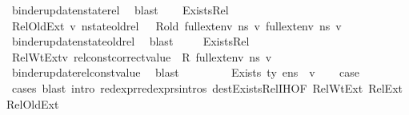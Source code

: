 \begin{isabellebody}
\ binder{\isacharunderscore}{\kern0pt}update{\isacharunderscore}{\kern0pt}nstate{\isacharunderscore}{\kern0pt}rel\ \isamarkupfalse%
\ blast\isanewline
\ \ \isamarkupfalse%
\ Exists{\isacharunderscore}{\kern0pt}Rel\ \isamarkupfalse%
\ RelOldExt{\isacharcolon}{\kern0pt}\ {\isachardoublequoteopen}{\isasymAnd}v{\isachardot}{\kern0pt}\ nstate{\isacharunderscore}{\kern0pt}old{\isacharunderscore}{\kern0pt}rel\ {\isasymLambda}\ {\isasymLambda}{\isacharprime}{\kern0pt}\ R{\isacharunderscore}{\kern0pt}old\ {\isacharparenleft}{\kern0pt}full{\isacharunderscore}{\kern0pt}ext{\isacharunderscore}{\kern0pt}env\ ns{}\ v{\isacharparenright}{\kern0pt}\ {\isacharparenleft}{\kern0pt}full{\isacharunderscore}{\kern0pt}ext{\isacharunderscore}{\kern0pt}env\ ns{}\ v{\isacharparenright}{\kern0pt}{\isachardoublequoteclose}\ \isamarkupfalse%
\ binder{\isacharunderscore}{\kern0pt}update{\isacharunderscore}{\kern0pt}nstate{\isacharunderscore}{\kern0pt}old{\isacharunderscore}{\kern0pt}rel\ \isamarkupfalse%
\ blast\ \isanewline
\ \ \isamarkupfalse%
\ Exists{\isacharunderscore}{\kern0pt}Rel\ \isamarkupfalse%
\ RelWtExt{\isacharcolon}{\kern0pt}{\isachardoublequoteopen}{\isasymAnd}v{\isachardot}{\kern0pt}\ rel{\isacharunderscore}{\kern0pt}const{\isacharunderscore}{\kern0pt}correct{\isacharunderscore}{\kern0pt}value\ {\isasymLambda}\ R\ {\isacharparenleft}{\kern0pt}full{\isacharunderscore}{\kern0pt}ext{\isacharunderscore}{\kern0pt}env\ ns{}\ v{\isacharparenright}{\kern0pt}{\isachardoublequoteclose}\ \isamarkupfalse%
\ binder{\isacharunderscore}{\kern0pt}update{\isacharunderscore}{\kern0pt}rel{\isacharunderscore}{\kern0pt}const{\isacharunderscore}{\kern0pt}value\ \isamarkupfalse%
\ blast\ \ \ \isanewline
\ \ \isamarkupfalse%
\ {\isacartoucheopen}{\isasymLambda}{\isacharcomma}{\kern0pt}{\isasymGamma}{\isacharcomma}{\kern0pt}{\isasymOmega}\ {\isasymturnstile}\ {\isasymlangle}Exists\ ty\ e{}{\isacharcomma}{\kern0pt}ns{}{\isasymrangle}\ {\isasymDown}\ v{\isacartoucheclose}\isanewline
\ \ \isamarkupfalse%
\ {\isacharquery}{\kern0pt}case\isanewline
\ \ \ \ \isamarkupfalse%
\ {\isacharparenleft}{\kern0pt}cases{\isacharsemicolon}{\kern0pt}\ blast\ intro{\isacharcolon}{\kern0pt}\ red{\isacharunderscore}{\kern0pt}expr{\isacharunderscore}{\kern0pt}red{\isacharunderscore}{\kern0pt}exprs{\isachardot}{\kern0pt}intros\ dest{\isacharcolon}{\kern0pt}Exists{\isacharunderscore}{\kern0pt}Rel{\isachardot}{\kern0pt}IH{\isacharparenleft}{\kern0pt}{}{\isacharparenright}{\kern0pt}{\isacharbrackleft}{\kern0pt}OF\ RelWtExt\ RelExt\ RelOldExt{\isacharbrackright}{\kern0pt}{\isacharparenright}{\kern0pt}\isanewline

\end{isabellebody}
